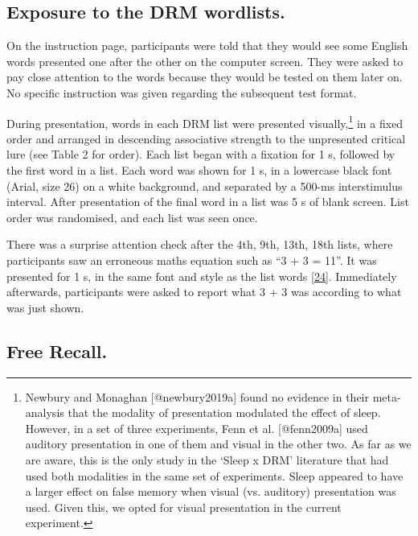 \documentclass[
]{article}
\begin{document}
\hypertarget{exposure-to-the-drm-wordlists.}{%
\subsection{Exposure to the DRM wordlists.}\label{exposure-to-the-drm-wordlists.}}

On the instruction page, participants were told that they would see some English words presented one after the other on the computer screen. They were asked to pay close attention to the words because they would be tested on them later on. No specific instruction was given regarding the subsequent test format.

During presentation, words in each DRM list were presented visually,\footnote{Newbury and Monaghan [@newbury2019a] found no evidence in their meta-analysis that the modality of presentation modulated the effect of sleep. However, in a set of three experiments, Fenn et al. [@fenn2009a] used auditory presentation in one of them and visual in the other two. As far as we are aware, this is the only study in the ‘Sleep x DRM’ literature that had used both modalities in the same set of experiments. Sleep appeared to have a larger effect on false memory when visual (vs. auditory) presentation was used. Given this, we opted for visual presentation in the current experiment. } in a fixed order and arranged in descending associative strength to the unpresented critical lure (see Table 2 for order). Each list began with a fixation for 1 s, followed by the first word in a list. Each word was shown for 1 s, in a lowercase black font (Arial, size 26) on a white background, and separated by a 500-ms interstimulus interval. After presentation of the final word in a list was 5 s of blank screen. List order was randomised, and each list was seen once.

There was a surprise attention check after the 4th, 9th, 13th, 18th lists, where participants saw an erroneous maths equation such as ``3 + 3 = 11''. It was presented for 1 s, in the same font and style as the list words {[}\protect\hyperlink{ref-thomas2017a}{24}{]}. Immediately afterwards, participants were asked to report what 3 + 3 was according to what was just shown.

\hypertarget{free-recall.}{%
\subsection{Free Recall.}\label{free-recall.}}
\end{document}
